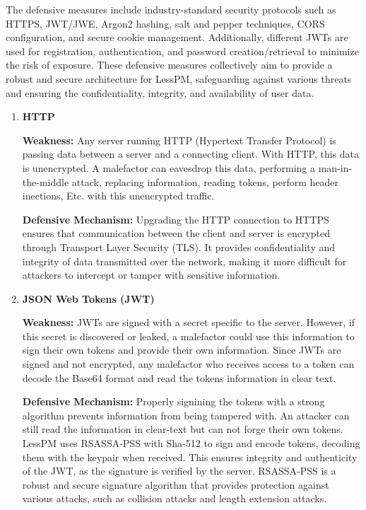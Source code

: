 The defensive measures include industry-standard security protocols such as
  HTTPS, JWT/JWE, Argon2 hashing, salt and pepper techniques, CORS
  configuration, and secure cookie management.
Additionally, different JWTs are used for registration, authentication, and
  password creation/retrieval to minimize the risk of exposure.
These defensive measures collectively aim to provide a robust and secure
  architecture for LessPM, safeguarding against various threats and ensuring
  the confidentiality, integrity, and availability of user data.
\begin{enumerate}[label=$\blacktriangleright$]
  \item \textbf{HTTP}

  \textbf{Weakness:}
  Any server running HTTP (Hypertext Transfer Protocol) is passing data
  between a server and a connecting client.
  With HTTP, this data is unencrypted.
  A malefactor can eavesdrop this data, performing a man-in-the-middle attack,
  replacing information, reading tokens, perform header inections, Etc. with 
  this unencrypted traffic.

  \textbf{Defensive Mechanism:}
  Upgrading the HTTP connection to HTTPS ensures that communication between the
  client and server is encrypted through Transport Layer Security (TLS).
  It provides confidentiality and integrity of data transmitted over the
  network, making it more difficult for attackers to intercept or tamper with
  sensitive information.

  \item \textbf{JSON Web Tokens (JWT)}

  \textbf{Weakness:}
  JWTs are signed with a secret specific to the server.
  However, if this secret is discovered or leaked, a malefactor could use this
  information to sign their own tokens and provide their own information.
  Since JWTs are signed and not encrypted, any malefactor who receives access
  to a token can decode the Base64 format and read the tokens information in
  clear text.

  \textbf{Defensive Mechanism:}
  Properly signining the tokens with a strong algorithm prevents information
  from being tampered with.
  An attacker can still read the information in clear-text but can not forge
  their own tokens.
  LessPM uses RSASSA-PSS with Sha-512 to sign and encode tokens, decoding
  them with the keypair when received.
  This ensures integrity and authenticity of the JWT, as the signature is
  verified by the server.
  RSASSA-PSS is a robust and secure signature algorithm that provides protection
  against various attacks, such as collision attacks and length extension
  attacks.


\end{enumerate}
